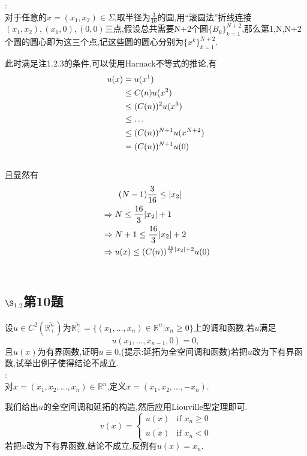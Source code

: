 \documentclass[12pt, a4paper]{ctexbook}
\begin{document}
    \songti{}
    :\\
    
    对于任意的$x=(x_1,x_2)\in \Sigma$,取半径为$\frac{3}{16}$的圆,用“滚圆法”折线连接$(x_1,x_2),(x_1,0),(0,0)$三点,假设总共需要N+2个圆$\{B_k\}_{k=1}^{N+2}$,那么第1,N,N+2个圆的圆心即为这三个点,记这些圆的圆心分别为$\{x^k\}_{k=1}^{N+2}$.
    
    
    此时满足注1.2.3的条件,可以使用Harnack不等式的推论,有
    \begin{align}
    u(x)&=u(x^1)\notag \\
    &\le C(n)u(x^2) \notag\\
    &\le (C(n))^2 u(x^3) \notag \\
    &\le \dots \notag \\
    &\le (C(n))^{N+1}u(x^{N+2}) \notag \\
    &= (C(n))^{N+1}u(0) \notag
    \end{align}\\
    且显然有
    \begin{align}
    &\qquad (N-1)\frac{3}{16} \le |x_2|    \notag \\
    &\Rightarrow N \le \frac{16}{3}|x_2| +1 \notag \\
    &\Rightarrow N+1 \le \frac{16}{3}|x_2| +2 \notag \\
    &\Rightarrow u(x) \le (C(n))^{\frac{16}{3}|x_2| +2}u(0) \notag
    \end{align}\\
    
    \subsection{$\S_{1.2}$第10题}
    \kaishu{}
    设$u \in C^2(\overline{\mathbb{R}_{+}^{n}})$为$\overline{\mathbb{R}_{+}^n}=\{(x_1,\dots,x_n)\in \mathbb{R}^n|x_n \ge 0\}$上的调和函数.若$u$满足$$u(x_1,\dots,x_{n-1},0)=0,$$且$u(x)$为有界函数,证明$u\equiv 0$.(提示:延拓为全空间调和函数)若把$u$改为下有界函数,试举出例子使得结论不成立.\\
    
    \songti{}
    :\\
    
    对$x=(x_1,x_2,\dots,x_n)\in \mathbb{R}^n$,定义$\bar{x}=(x_1,x_2,\dots,-x_n)$.
    
    我们给出$u$的全空间调和延拓的构造,然后应用Liouville型定理即可.$$
    v(x)=\begin{cases}
    u(x) & \text{if } x_n \ge 0\\
    \overline{u(\bar{x})} & \text{if } x_n < 0
    \end{cases}$$
    若把$u$改为下有界函数,结论不成立,反例有$u(x)=x_n$.
    
\end{document}
